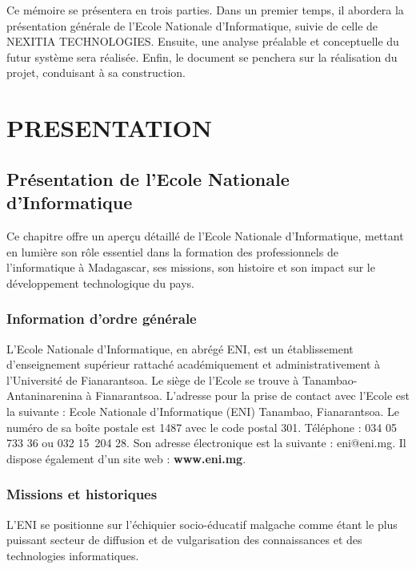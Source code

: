 \documentclass[12pt]{report}
\begin{document}
\begin{center}
\begin{minipage}{\textwidth}
					\hspace{15pt}Ce mémoire se présentera en trois parties. Dans un premier temps, il abordera la présentation générale de l’Ecole Nationale d’Informatique, suivie de celle de NEXITIA TECHNOLOGIES. Ensuite, une analyse préalable et conceptuelle du futur système sera réalisée. Enfin, le document se penchera sur la réalisation du projet, conduisant à sa construction.
				\end{minipage}
			\end{center}
			\part{PRESENTATION}
			\chapter{Présentation de l’Ecole Nationale d’Informatique}

			\hspace{15pt} Ce chapitre offre un aperçu détaillé de l'Ecole Nationale d’Informatique, mettant en lumière son rôle essentiel dans la formation des professionnels de l'informatique à Madagascar, ses missions, son histoire et son impact sur le développement technologique du pays.			

			\section{Information d’ordre générale }
				\hspace{15pt} L’Ecole Nationale d’Informatique, en abrégé ENI, est un établissement d’enseignement supérieur rattaché académiquement et administrativement à l’Université de Fianarantsoa. Le siège de l’Ecole se trouve à Tanambao-Antaninarenina à Fianarantsoa. L’adresse pour la prise de contact avec l’Ecole est la suivante : Ecole Nationale d’Informatique (ENI) Tanambao, Fianarantsoa. Le numéro de sa boîte postale est 1487 avec le code postal 301. Téléphone : 034 05 733 36 ou 032 15 204 28. Son adresse électronique est la suivante : eni@eni.mg. Il dispose également d'un site web : \textbf{www.eni.mg}.

			\section{Missions et historiques}
				\hspace{15pt} L’ENI se positionne sur l’échiquier socio-éducatif malgache comme étant le plus puissant secteur de diffusion et de vulgarisation des connaissances et des technologies informatiques. \\
\end{document}
